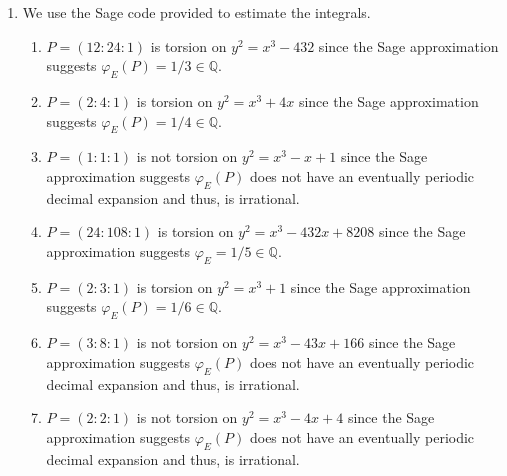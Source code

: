 \documentclass[12 pt, letterpaper]{hmcpset}
\begin{document}
\begin{solution}
\begin{enumerate}
			Now suppose $\varphi_{E}(P) \in \mathbb{A}^{1}(\mathbb{Q})/\mathbb{A}^{1}(\mathbb{Z})$. Then, since we showed that $\mathbb{A}^{1}(\mathbb{Q})/\mathbb{A}^{1}(\mathbb{Z})$ is torsion, we have some $n \in \mathbb{N}$ such that $[n] \varphi_{E}(P) = \overline{0}$. But then $\varphi([n]P) = \overline{0}$ and since $\varphi_{E}$ is injective $[n] P = O_{E}$.
		\item
			We use the Sage code provided to estimate the integrals.
			\begin{enumerate}[label = (\roman*)]
				\item $P = (12 : 24 : 1)$ is torsion on $y^{2} = x^{3} - 432$ since the Sage approximation suggests $\varphi_{E}(P) = 1/3 \in \mathbb{Q}$.
				\item $P = (2 : 4 : 1)$ is torsion on $y^{2} = x^{3} + 4x$ since the Sage approximation suggests $\varphi_{E}(P) = 1/4 \in \mathbb{Q}$.
				\item $P = (1 : 1 : 1)$ is not torsion on $y^{2} = x^{3} - x + 1$ since the Sage approximation suggests $\varphi_{E}(P)$ does not have an eventually periodic decimal expansion and thus, is irrational.
				\item $P = (24 : 108 : 1)$ is torsion on $y^{2} = x^{3} - 432 x + 8208$ since the Sage approximation suggests $\varphi_{E} = 1/5 \in \mathbb{Q}$.
				\item $P = (2 : 3 : 1)$ is torsion on $y^{2} = x^{3} + 1$ since the Sage approximation suggests $\varphi_{E}(P) = 1/6 \in \mathbb{Q}$.
				\item $P = (3 : 8 : 1)$ is not torsion on $y^{2} = x^{3} - 43 x + 166$ since the Sage approximation suggests $\varphi_{E}(P)$ does not have an eventually periodic decimal expansion and thus, is irrational.
				\item $P = (2 : 2 : 1)$ is not torsion on $y^{2} = x^{3} - 4x + 4$ since the Sage approximation suggests $\varphi_{E}(P)$ does not have an eventually periodic decimal expansion and thus, is irrational.
			\end{enumerate}
	\end{enumerate}
\end{solution}
\end{document}
